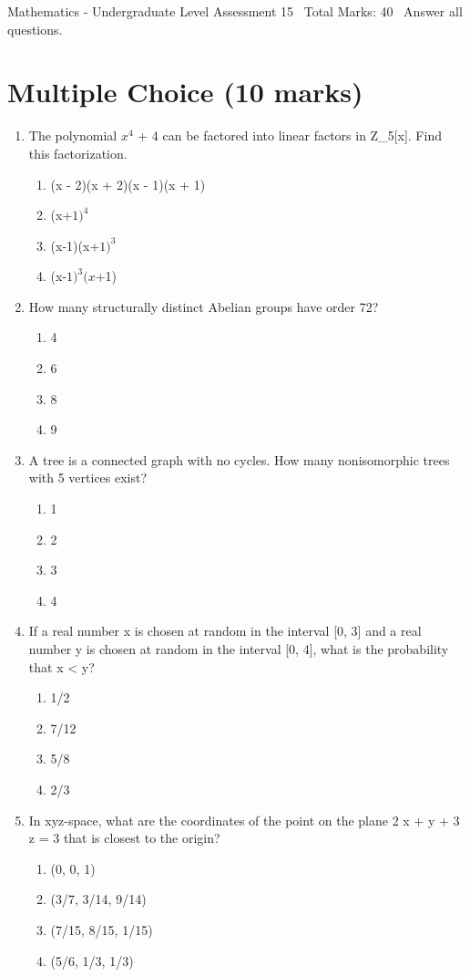 \documentclass[12pt]{article}
\begin{document}
\begin{center}
Mathematics - Undergraduate Level Assessment 15 \
Total Marks: 40 \
Answer all questions.
\end{center}

\section*{Multiple Choice (10 marks)}
\begin{enumerate}[label=\arabic*.]
\item The polynomial $x^4$ + 4 can be factored into linear factors in Z\_5[x]. Find this factorization.
\begin{enumerate}[label=(\alph*)]
    \item (x - 2)(x + 2)(x - 1)(x + 1)
    \item (x+$1)^4$
    \item (x-1)(x+$1)^3$
    \item (x-$1)^3(x$+1)
\end{enumerate}
\item How many structurally distinct Abelian groups have order 72?
\begin{enumerate}[label=(\alph*)]
    \item 4
    \item 6
    \item 8
    \item 9
\end{enumerate}
\item A tree is a connected graph with no cycles. How many nonisomorphic trees with 5 vertices exist?
\begin{enumerate}[label=(\alph*)]
    \item 1
    \item 2
    \item 3
    \item 4
\end{enumerate}
\item If a real number x is chosen at random in the interval [0, 3] and a real number y is chosen at random in the interval [0, 4], what is the probability that x \textless{} y?
\begin{enumerate}[label=(\alph*)]
    \item 1/2
    \item 7/12
    \item 5/8
    \item 2/3
\end{enumerate}
\item In xyz-space, what are the coordinates of the point on the plane 2 x + y + 3 z = 3 that is closest to the origin?
\begin{enumerate}[label=(\alph*)]
    \item (0, 0, 1)
    \item (3/7, 3/14, 9/14)
    \item (7/15, 8/15, 1/15)
    \item (5/6, 1/3, 1/3)
\end{enumerate}
\end{enumerate}
\end{document}
